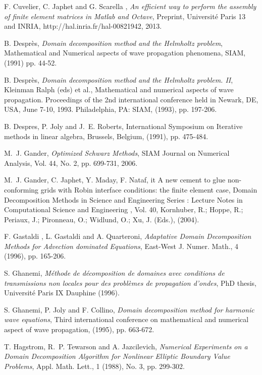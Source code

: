 \documentclass[final]{siamltex}
\begin{document}
\begin{thebibliography}{10}
 {\sc F. Cuvelier, C. Japhet and G. Scarella} , {\em An efficient way to perform the assembly of
finite element matrices in Matlab and Octave}, Preprint, Universit\'e Paris 13 and INRIA,
http://hal.inria.fr/hal-00821942, 2013.

 {\sc B. Despr\`es}, {\em Domain decomposition
  method and the Helmholtz problem}, Mathematical and Numerical
  aspects of wave propagation phenomena, SIAM, (1991) pp. 44-52.

 {\sc B. Despr\`es}, {\em Domain decomposition
  method and the Helmholtz problem. II}, Kleinman Ralph (eds) et al.,
  Mathematical and numerical aspects of wave propagation. Proceedings
  of the 2nd international conference held in Newark, DE, USA, June
  7-10, 1993. Philadelphia, PA: SIAM, (1993), pp. 197-206.
 
 {\sc B. Despres, P. Joly and J.~E. Roberts},
  International Symposium on Iterative methods in linear algebra,
  Brussels, Belgium, (1991), pp. 475-484.

 {\sc M.~J. Gander}, {\em Optimized Schwarz Methods},
 SIAM Journal on Numerical Analysis, Vol. 44, No. 2, pp. 699-731, 2006.
    
 {\sc M.~J. Gander, C. Japhet, Y. Maday, F. Nataf}, {it
  A new cement to glue non-conforming grids with Robin interface
  conditions: the finite element case}, Domain Decomposition Methods
  in Science and Engineering Series : Lecture Notes in Computational
  Science and Engineering , Vol. 40, Kornhuber, R.; Hoppe, R.;
  Periaux, J.; Pironneau, O.; Widlund, O.; Xu, J. (Eds.), (2004).

 {\sc F. Gastaldi , L. Gastaldi and
  A. Quarteroni}, {\em Adaptative Domain Decomposition Methods for
  Advection dominated Equations}, East-West J. Numer. Math., 4 (1996),
  pp. 165-206.
 
 {\sc S. Ghanemi}, {\em M\'ethode de d\'ecomposition de
  domaines avec conditions de transmissions non locales pour des
  probl\`emes de propagation d'ondes},  PhD thesis, Universit\'e 
  Paris IX Dauphine (1996).

 {\sc S. Ghanemi, P. Joly and F. Collino}, {\em Domain
  decomposition method for harmonic wave equations}, Third
  international conference on mathematical and numerical aspect of
  wave propagation, (1995), pp. 663-672.

 {\sc T. Hagstrom, R.~P. Tewarson and A.
  Jazcilevich}, {\em Numerical Experiments on a Domain Decomposition
  Algorithm for Nonlinear Elliptic Boundary Value Problems},
  Appl. Math.  Lett., 1 (1988), No. 3, pp. 299-302.
  

\end{thebibliography}
\end{document}
